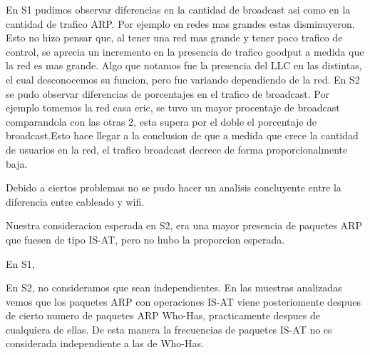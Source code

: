 	En S1 pudimos observar diferencias en la cantidad de broadcast asi como en la cantidad de trafico ARP. Por ejemplo en redes mas grandes estas disminuyeron. Esto no hizo pensar que, al tener una red mas grande y tener poco trafico de control, se aprecia un incremento en la presencia de trafico goodput a medida que la red es mas grande. Algo que notamos fue la presencia del LLC en las distintas, el cual desconocemos su funcion, pero fue variando dependiendo de la red.
	En S2 se pudo observar diferencias de porcentajes en el trafico de broadcast. Por ejemplo tomemos la red casa eric, se tuvo un mayor procentaje de broadcast comparandola con las otras 2, esta supera por el doble el porcentaje de broadcast.Esto hace llegar a la conclusion de que a medida que crece la cantidad de usuarios en la red, el trafico broadcast decrece de forma proporcionalmente baja.


Debido a ciertos problemas no se pudo hacer un analisis concluyente entre la diferencia entre cableado y wifi.

Nuestra consideracion esperada en S2, era una mayor presencia de paquetes ARP que fuesen de tipo IS-AT, pero no hubo la proporcion esperada.


En S1, 

En S2, no consideramos que sean independientes. En las muestras analizadas vemos que los paquetes ARP con operaciones IS-AT viene posteriomente despues de cierto numero de paquetes ARP Who-Has, practicamente despues de cualquiera de ellas. De esta manera la frecuencias de paquetes IS-AT no es considerada independiente a las de Who-Has.


